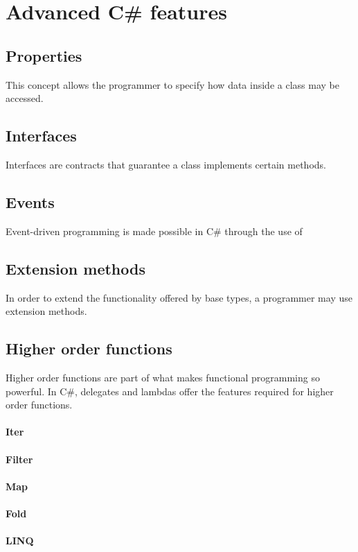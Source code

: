 \documentclass{article}
\begin{document}
\newpage

\section{Advanced C\# features}
\subsection{Properties}
This concept allows the programmer to specify how data inside a class may be accessed.

\subsection{Interfaces}
Interfaces are contracts that guarantee a class implements certain methods.

\subsection{Events}
Event-driven programming is made possible in C\# through the use of

\subsection{Extension methods}
In order to extend the functionality offered by base types, a programmer may use extension methods.

\subsection{Higher order functions}
Higher order functions are part of what makes functional programming so powerful.
In C\#, delegates and lambdas offer the features required for higher order functions.

\paragraph{Iter}
\paragraph{Filter}
\paragraph{Map}
\paragraph{Fold}
\paragraph{LINQ}
\end{document}
